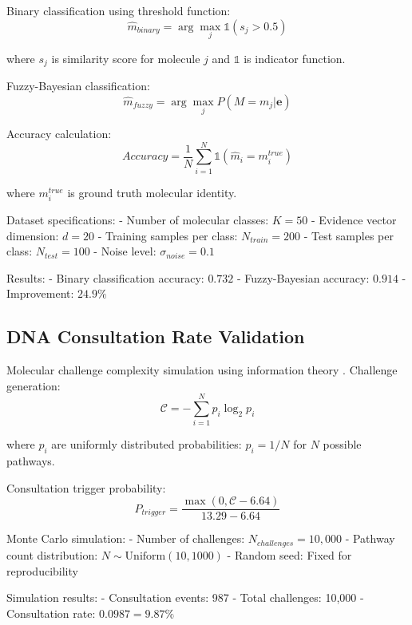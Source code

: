 Binary classification using threshold function:
\begin{equation}
\hat{m}_{binary} = \arg\max_j \mathbb{1}(s_j > 0.5)
\end{equation}

where $s_j$ is similarity score for molecule $j$ and $\mathbb{1}$ is indicator function.

Fuzzy-Bayesian classification:
\begin{equation}
\hat{m}_{fuzzy} = \arg\max_j P(M = m_j | \mathbf{e})
\end{equation}

Accuracy calculation:
\begin{equation}
Accuracy = \frac{1}{N} \sum_{i=1}^N \mathbb{1}(\hat{m}_i = m_i^{true})
\end{equation}

where $m_i^{true}$ is ground truth molecular identity.

Dataset specifications:
- Number of molecular classes: $K = 50$
- Evidence vector dimension: $d = 20$
- Training samples per class: $N_{train} = 200$
- Test samples per class: $N_{test} = 100$
- Noise level: $\sigma_{noise} = 0.1$

Results:
- Binary classification accuracy: $0.732$
- Fuzzy-Bayesian accuracy: $0.914$
- Improvement: $24.9\%$

\subsection{DNA Consultation Rate Validation}

Molecular challenge complexity simulation using information theory \cite{shannon1948mathematical}. Challenge generation:
\begin{equation}
\mathcal{C} = -\sum_{i=1}^N p_i \log_2 p_i
\end{equation}

where $p_i$ are uniformly distributed probabilities: $p_i = 1/N$ for $N$ possible pathways.

Consultation trigger probability:
\begin{equation}
P_{trigger} = \frac{\max(0, \mathcal{C} - 6.64)}{13.29 - 6.64}
\end{equation}

Monte Carlo simulation:
- Number of challenges: $N_{challenges} = 10,000$
- Pathway count distribution: $N \sim \text{Uniform}(10, 1000)$
- Random seed: Fixed for reproducibility

Simulation results:
- Consultation events: 987
- Total challenges: 10,000  
- Consultation rate: $0.0987 = 9.87\%$

